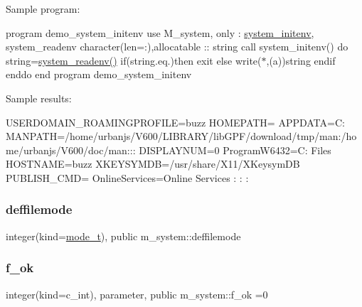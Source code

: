 Sample program\+:

program demo\+\_\+system\+\_\+initenv use M\+\_\+system, only \+: \mbox{\hyperlink{interfacem__system_1_1system__initenv}{system\+\_\+initenv}}, system\+\_\+readenv character(len=\+:),allocatable \+:\+: string call system\+\_\+initenv() do string=\mbox{\hyperlink{namespacem__system_ae0e43010a82a6a25402568ccb326322d}{system\+\_\+readenv()}} if(string.\+eq.\textquotesingle{}\textquotesingle{})then exit else write($\ast$,\textquotesingle{}(a)\textquotesingle{})string endif enddo end program demo\+\_\+system\+\_\+initenv

Sample results\+:

U\+S\+E\+R\+D\+O\+M\+A\+I\+N\+\_\+\+R\+O\+A\+M\+I\+N\+G\+P\+R\+O\+F\+I\+LE=buzz H\+O\+M\+E\+P\+A\+TH= A\+P\+P\+D\+A\+TA=C\+: M\+A\+N\+P\+A\+TH=/home/urbanjs/\+V600/\+L\+I\+B\+R\+A\+R\+Y/lib\+G\+P\+F/download/tmp/man\+:/home/urbanjs/\+V600/doc/man\+:\+:\+: D\+I\+S\+P\+L\+A\+Y\+N\+UM=0 Program\+W6432=C\+: Files H\+O\+S\+T\+N\+A\+ME=buzz X\+K\+E\+Y\+S\+Y\+M\+DB=/usr/share/\+X11/\+X\+Keysym\+DB P\+U\+B\+L\+I\+S\+H\+\_\+\+C\+MD= Online\+Services=Online Services \+: \+: \+: \mbox{\label{namespacem__system_a04a5b1ef384bcbb8ad3b0c81ce95001a}} 
\subsubsection{\texorpdfstring{deffilemode}{deffilemode}}
{\footnotesize\ttfamily integer(kind=\mbox{\hyperlink{namespacem__system_abdb5cc27c945379d844db4830d499050}{mode\+\_\+t}}), public m\+\_\+system\+::deffilemode}

\mbox{\label{namespacem__system_ad34c4f18dd5b7dbe445cca25bbae9a74}} 
\subsubsection{\texorpdfstring{f\+\_\+ok}{f\_ok}}
{\footnotesize\ttfamily integer(kind=c\+\_\+int), parameter, public m\+\_\+system\+::f\+\_\+ok =0}

\mbox{\label{namespacem__system_a6501a3671053239dae9b69b95c0a5f55}} 
